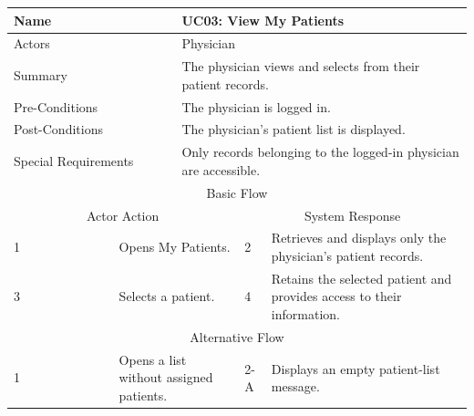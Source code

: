 \begin{reporttable}
\centering
\small
\caption{UC03: View My Patients.}
\label{tab:kashaf:uc03}
\begin{tabular}{|p{}|p{}|p{}|p{}|p{}|}
\hline
\multicolumn{2}{|p{\dimexpr0.225\textwidth+2\tabcolsep+\arrayrulewidth\relax}|}{Name} & \multicolumn{3}{p{\dimexpr0.575\textwidth+4\tabcolsep+2\arrayrulewidth\relax}|}{UC03: View My Patients} \\ \hline
\multicolumn{2}{|p{\dimexpr0.225\textwidth+2\tabcolsep+\arrayrulewidth\relax}|}{Actors} & \multicolumn{3}{p{\dimexpr0.575\textwidth+4\tabcolsep+2\arrayrulewidth\relax}|}{Physician} \\ \hline
\multicolumn{2}{|p{\dimexpr0.225\textwidth+2\tabcolsep+\arrayrulewidth\relax}|}{Summary} & \multicolumn{3}{p{\dimexpr0.575\textwidth+4\tabcolsep+2\arrayrulewidth\relax}|}{The physician views and selects from their patient records.} \\ \hline
\multicolumn{2}{|p{\dimexpr0.225\textwidth+2\tabcolsep+\arrayrulewidth\relax}|}{Pre-Conditions} & \multicolumn{3}{p{\dimexpr0.575\textwidth+4\tabcolsep+2\arrayrulewidth\relax}|}{The physician is logged in.} \\ \hline
\multicolumn{2}{|p{\dimexpr0.225\textwidth+2\tabcolsep+\arrayrulewidth\relax}|}{Post-Conditions} & \multicolumn{3}{p{\dimexpr0.575\textwidth+4\tabcolsep+2\arrayrulewidth\relax}|}{The physician's patient list is displayed.} \\ \hline
\multicolumn{2}{|p{\dimexpr0.225\textwidth+2\tabcolsep+\arrayrulewidth\relax}|}{Special Requirements} & \multicolumn{3}{p{\dimexpr0.575\textwidth+4\tabcolsep+2\arrayrulewidth\relax}|}{Only records belonging to the logged-in physician are accessible.} \\ \hline
\multicolumn{5}{|c|}{Basic Flow} \\ \hline
\multicolumn{3}{|c|}{Actor Action} & \multicolumn{2}{c|}{System Response} \\ \hline
1 & \multicolumn{2}{p{\dimexpr0.37\textwidth+2\tabcolsep+\arrayrulewidth\relax}|}{Opens My Patients.} & 2 & Retrieves and displays only the physician's patient records. \\ \hline
3 & \multicolumn{2}{p{\dimexpr0.37\textwidth+2\tabcolsep+\arrayrulewidth\relax}|}{Selects a patient.} & 4 & Retains the selected patient and provides access to their information. \\ \hline
\multicolumn{5}{|c|}{Alternative Flow} \\ \hline
1 & \multicolumn{2}{p{\dimexpr0.37\textwidth+2\tabcolsep+\arrayrulewidth\relax}|}{Opens a list without assigned patients.} & 2-A & Displays an empty patient-list message. \\ \hline
\end{tabular}
\end{reporttable}


